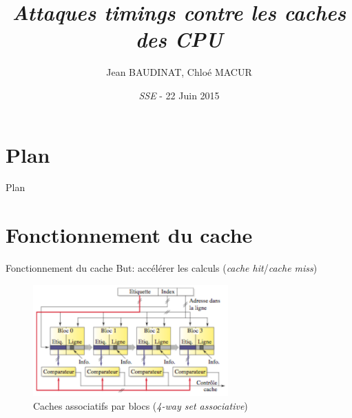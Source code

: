 \documentclass[11pt]{beamer}
\begin{document}
\title[Attaques timings contre les caches des CPU]{\textit{Attaques timings contre les caches des CPU} }

\author[Jean BAUDINAT, Chloé MACUR]{Jean BAUDINAT, Chloé MACUR}

\date[\thedate]{\footnotesize{\textsl{SSE} - 22 Juin 2015}}

\begin{frame}
  \titlepage
\end{frame}

\section*{Plan}
\addtocounter{section}{-1}
\begin{frame}{Plan} 
  \tableofcontents%
\end{frame}




\section[Fonctionnement du cache]{Fonctionnement du cache}

\begin{frame}{Fonctionnement du cache}
But: accélérer les calculs (\emph{cache hit}/\emph{cache miss})

\begin{figure}[h]
  \centering
  \includegraphics[width=7.5cm]{figures/cache_associative.png}
  \caption{Caches associatifs par blocs (\emph{4-way set associative})}
  \label{cache} 
\end{figure}
\end{frame}
\end{document}
